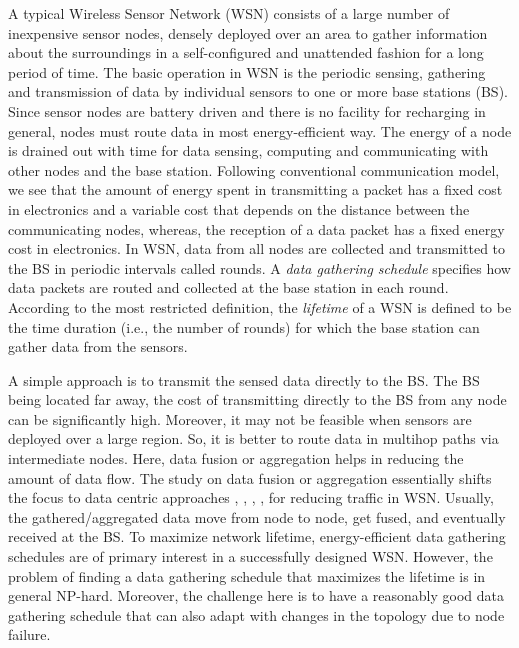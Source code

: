 \documentclass[10pt]{llncs}
\begin{document}
A typical Wireless Sensor Network (WSN) consists of a large number of inexpensive sensor nodes, densely deployed over an area to gather information about the surroundings in a self-configured and unattended fashion for a long period of time. The basic operation in WSN is the periodic sensing, gathering and transmission of data by individual sensors to one or more base stations (BS). Since sensor nodes are battery driven and there is no facility for recharging in general, nodes must route data in most energy-efficient way. The energy of a node is drained out with time for data sensing, computing and communicating with other nodes and the base station. Following conventional communication model, we see that the amount of energy spent in transmitting a packet has a fixed cost in electronics and a variable cost that depends on the distance between the communicating nodes, whereas, the reception of a data packet has a fixed energy cost in electronics. In WSN, data from all nodes are collected and transmitted to the BS in periodic intervals called rounds. A {\it data gathering schedule} specifies how data packets are routed and collected at the base station in each round. According to the most restricted definition, the {\it lifetime} of a WSN is defined to be the time duration (i.e., the number of rounds) for which the base station can gather data from the sensors.

A simple approach is to transmit the sensed data directly to the BS. The BS being located far away, the cost of transmitting directly to the BS from any node can be significantly high. Moreover, it may not be feasible when sensors are deployed over a large region. So, it is better to route data in multihop paths via intermediate nodes. Here, data fusion \cite{Li08} or aggregation helps in reducing the amount of data flow. The study on data fusion or aggregation essentially shifts the focus to data centric approaches \cite{Intanagonwiwat00}, \cite{Krishnamachari02}, \cite{Lindsey01}, \cite{Lindsey02}, \cite{Madden02} for reducing traffic in WSN. Usually, the gathered/aggregated data move from node to node, get fused, and eventually received at the BS. To maximize network lifetime, energy-efficient data gathering schedules are of primary interest in a successfully designed WSN. However, the problem of finding a data gathering schedule that maximizes the lifetime is in general NP-hard. Moreover, the challenge here is to have a reasonably good data gathering schedule that can also adapt with changes in the topology due to node failure.
\end{document}
